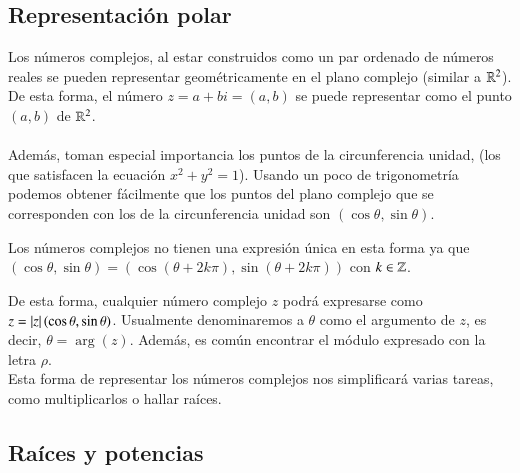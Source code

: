 \subsection{Representaci\'on polar}
    Los números complejos, al estar construidos como un par ordenado de números reales se pueden representar geométricamente en el plano complejo (similar a $\mathbb{R}^2$). De esta forma, el número $z = a + bi = (a, b)$ se puede representar como el punto $(a, b)$ de $\mathbb{R}^2$.\\\\
    Además, toman especial importancia los puntos de la circunferencia unidad, (los que satisfacen la ecuación $x^2 + y^2 = 1$). Usando un poco de trigonometría podemos obtener fácilmente que los puntos del plano complejo que se corresponden con los de la circunferencia unidad son $(\cos \theta, \sin \theta)$.

    \begin{obs}
        Los números complejos no tienen una expresión única en esta forma ya que $(\cos \theta, \sin \theta) = (\cos (\theta + 2k\pi), \sin  (\theta + 2k\pi) )$ con $k \in \mathbb{Z}$.
    \end{obs}

    \begin{center}
    \end{center}

    De esta forma, cualquier número complejo $z$ podrá expresarse como $z = \left|z\right|(\cos \theta, \sin \theta)$. Usualmente denominaremos a $\theta$ como el argumento de $z$, es decir, $\theta=\arg(z)$. Además, es común encontrar el módulo expresado con la letra $\rho$.\\

    Esta forma de representar los números complejos nos simplificará varias tareas, como multiplicarlos o hallar raíces.


\subsection{Ra\'ices y potencias}
